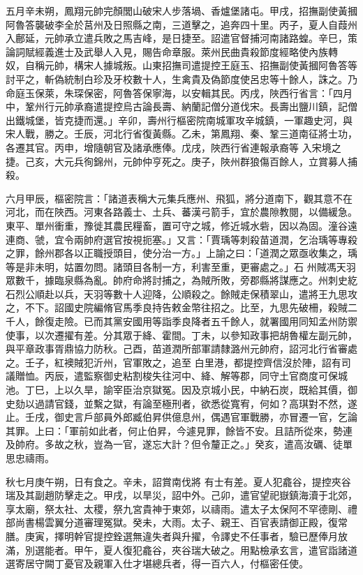 \begin{pinyinscope}
 五月辛未朔，鳳翔元帥完顏閭山破宋人步落堝、香爐堡諸屯。甲戌，招撫副使黃摑阿魯答襲破李全於莒州及日照縣之南，三道擊之，追奔四十里。丙子，夏人自葭州入鄜延，元帥承立遣兵敗之馬吉峰，是日捷至。詔遣官督捕河南諸路蝗。辛巳，策論詞賦經義進士及武舉人入見，賜告命章服。萊州民曲貴殺節度經略使內族轉
 奴，自稱元帥，構宋人據城叛。山東招撫司遣提控王庭玉、招撫副使黃摑阿魯答等討平之，斬偽統制白珍及牙校數十人，生禽貴及偽節度使呂忠等十餘人，誅之。乃命庭玉保萊，朱琛保密，阿魯答保寧海，以安輯其民。丙戌，陜西行省言：「四月中，鞏州行元帥承裔遣提控烏古論長壽、納蘭記僧分道伐宋。長壽出鹽川鎮，記僧出鐵城堡，皆克捷而還。」辛卯，壽州行樞密院南城軍攻辛城鎮，一軍趣史河，與宋人戰，勝之。壬辰，河北行省復黃縣。乙未，第鳳翔、秦、鞏三道南征將士功，各遷其官。丙申，增隨朝官及諸承應俸。戊戌，陜西行省連報承裔等
 入宋境之捷。己亥，大元兵徇錦州，元帥仲亨死之。庚子，陜州群狼傷百餘人，立賞募人捕殺。



 六月甲辰，樞密院言：「諸道表稱大元集兵應州、飛狐，將分道南下，觀其意不在河北，而在陜西。河東各路義士、土兵、蕃漢弓箭手，宜於農隙教閱，以備緩急。東平、單州衝重，豫徙其農民糧畜，置可守之城，修近城水砦，因以為固。潼谷遠連商、虢，宜令兩帥府選官按視扼塞。」又言：「賈瑀等刺殺苗道潤，乞治瑀等專殺之罪，餘州郡各以正職授頭目，使分治一方。」上諭之曰：「道潤之眾亟收集之，瑀等是非未明，姑置勿問。諸頭目各制一方，利害至重，更審處之。」石
 州賊馮天羽眾數千，據臨泉縣為亂。帥府命將討捕之，為賊所敗，旁郡縣將謀應之。州刺史紇石烈公順赴以兵，天羽等數十人迎降，公順殺之。餘賊走保積翠山，遣將王九思攻之，不下。詔國史院編脩官馬季良持告敕金幣往招之。比至，九思先破柵，殺賊二千人，餘復走險。已而其黨安國用等詣季良降者五千餘人，就署國用同知孟州防禦使事，以次遷擢有差。分其眾于絳、霍間。丁未，以參知政事把胡魯權左副元帥，與平章政事胥鼎協力防秋。己酉，苗道潤所部軍請隸潞州元帥府，詔河北行省審處之。壬子，紅襖賊犯沂州，官軍敗之，追至
 白里港，都提控齊信沒於陣，詔有司議贈恤。丙辰，遣監察御史粘割梭失往河中、絳、解等郡，同守土官商度可保城池。丁巳，上以久旱，諭宰臣治京獄冤。因及京城小民，中納石炭，既給其價，御史劾以過請官錢，並繫之獄，有論至極刑者，欲悉從寬宥，何如？高琪對不然，遂止。壬戌，御史言戶部員外郎臧伯昇供億息州，偶遇官軍戰勝，亦冒遷一官，乞論其罪。上曰：「軍前如此者，何止伯昇，今遽見罪，餘皆不安。且詰所從來，勢連及帥府。多故之秋，豈為一官，遂忘大計？但令釐正之。」癸亥，遣高汝礪、徒單思忠禱雨。



 秋七月庚午朔，日有食之。辛未，詔賞南伐將
 有士有差。夏人犯龕谷，提控夾谷瑞及其副趙防擊走之。甲戌，以旱災，詔中外。己卯，遣官望祀嶽鎮海瀆于北郊，享太廟，祭太社、太稷，祭九宮貴神于東郊，以禱雨。遣太子太保阿不罕德剛、禮部尚書楊雲翼分道審理冤獄。癸未，大雨。太子、親王、百官表請御正殿，復常膳。庚寅，擇明幹官提控銓選無違失者與升擢，令譯史不任事者，驗已歷俸月放滿，別選能者。甲午，夏人復犯龕谷，夾谷瑞大破之。用點檢承玄言，遣官詣諸道選寄居守闕丁憂官及親軍入仕才堪總兵者，得一百六人，付樞密任使。




\end{pinyinscope}
